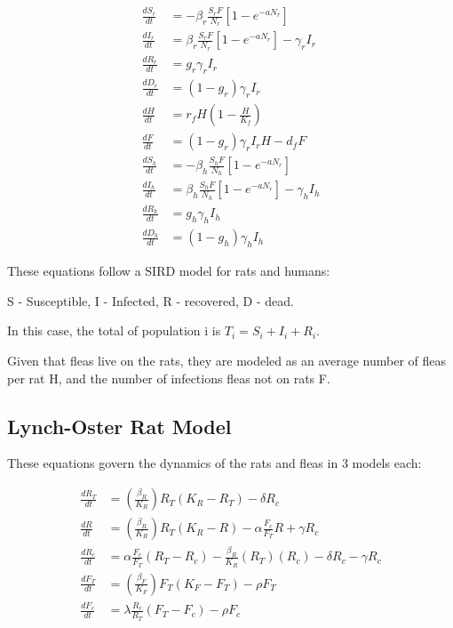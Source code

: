 \documentclass [letterpaper, 12pt] {article}
\begin{document}
\begin{equation}
	\begin{align*}
		\frac{dS_r}{dt} &= - \beta_r \frac{S_r F}{N_r} \left[ 1 - e^{-aN_r} \right] \\
		\frac{dI_r}{dt} &= \beta_r \frac{S_r F}{N_r} \left[ 1 - e^{-aN_r} \right] - \gamma_r I_r \\
		\frac{dR_r}{dt} &= g_r \gamma_r I_r \\
		\frac{dD_r}{dt} &= (1 - g_r) \gamma_r I_r \\
		\frac{dH}{dt} &= r_f H \left( 1 - \frac{H}{K_f} \right) \\
		\frac{dF}{dt} &= (1 - g_r) \gamma_r I_r H - d_f F \\
		\frac{dS_h}{dt} &= - \beta_h \frac{S_h F}{N_h} \left[ 1 - e^{-aN_r} \right] \\
		\frac{dI_h}{dt} &= \beta_h \frac{S_h F}{N_h} \left[ 1 - e^{-aN_r} \right] - \gamma_h I_h \\
		\frac{dR_h}{dt} &= g_h \gamma_h I_h \\
		\frac{dD_h}{dt} &= (1 - g_h) \gamma_h I_h
	\end{align*}
\end{equation}

These equations follow a SIRD model for rats and humans:

S - Susceptible,
I - Infected,
R - recovered,
D - dead.

In this case, the total of population i is $T_i = S_i + I_i + R_i$.

Given that fleas live on the rats, they are modeled as an average number of fleas per rat H, and the number of infections fleas not on rats F.

\subsection{Lynch-Oster Rat Model}

These equations govern the dynamics of the rats and fleas in 3 models each:

\begin{equation}
	\begin{align*}
		\frac{dR_T}{dt} &= (\frac{\beta_R}{K_R})R_T(K_R-R_T)-\delta R_c \\
		\frac{dR}{dt} &= (\frac{\beta_R}{K_R})R_T(K_R-R)-\alpha \frac{F_c}{F_T}R+\gamma  R_c \\
		\frac{dR_c}{dt} &= \alpha \frac{F_c}{F_T} (R_T-R_c)-\frac{\beta_R}{K_R}(R_T)(R_c) - \delta R_c - \gamma R_c \\
		\frac{dF_T}{dt} &= (\frac{\beta_F}{K_F})F_T(K_F-F_T)-\rho F_T  \\
		\frac{dF_c}{dt} &= \lambda \frac{R_c}{R_T} (F_T-F_c) - \rho F_c 
	\end{align*}
\end{equation}
\end{document}
